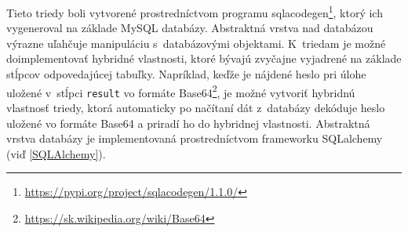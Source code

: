 \documentclass[slovak]{fitthesis}
\begin{document}
\noindent
Tieto triedy boli vytvorené prostredníctvom programu sqlacodegen\footnote{\url{https://pypi.org/project/sqlacodegen/1.1.0/}}, ktorý ich vygeneroval na základe MySQL databázy. Abstraktná vrstva nad databázou výrazne uľahčuje manipuláciu s~databázovými objektami. K~triedam je možné doimplementovať hybridné vlastnosti, ktoré bývajú zvyčajne vyjadrené na základe stĺpcov odpovedajúcej tabuľky. Napríklad, keďže je nájdené heslo pri úlohe uložené v~stĺpci \texttt{result} vo formáte Base64\footnote{\url{https://sk.wikipedia.org/wiki/Base64}}, je možné vytvoriť hybridnú vlastnosť triedy, ktorá automaticky po načítaní dát z~databázy dekóduje heslo uložené vo formáte Base64 a priradí ho do hybridnej vlastnosti. Abstraktná vrstva databázy je implementovaná prostredníctvom frameworku SQLalchemy (viď \ref{SQLAlchemy}).
\end{document}
